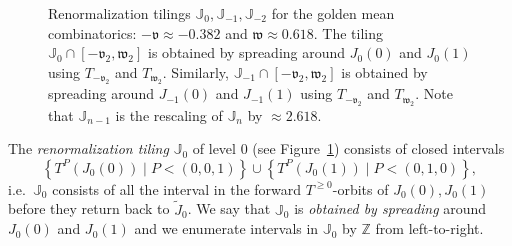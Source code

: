 \documentclass{amsart}
\newcommand{\1}{{\mathbb 1 }}
\newcommand{\vv}{\mathfrak{v}}
\newcommand{\ww}{\mathfrak{w}}
\newcommand{\Z}{\mathbb{Z}}
\theoremstyle{remark}
\numberwithin{equation}{section}
\theoremstyle{definition}
\theoremstyle{nonumberbreak}
\begin{document}
\begin{figure}

\caption{Renormalization tilings $\mathbb J_{0}, \mathbb J_{-1}, \mathbb J_{-2}$ for the golden mean combinatorics: $-\vv\approx -0.382$ and $\ww\approx 0.618$. The tiling $\mathbb J_{0}\cap [-\vv_2,\ww_2]$ is obtained by spreading around $J_0(0)$ and $J_0(1)$ using $T_{-\vv_2}$ and $T_{\ww_2}$. Similarly, $\mathbb J_{-1}\cap [-\vv_2,\ww_2]$ is obtained by spreading around $J_{-1}(0)$ and $J_{-1}(1)$ using $T_{-\vv_2}$ and $T_{\ww_2}$. Note that $\mathbb J_{n-1}$ is the rescaling of $\mathbb J_{n}$ by $\approx 2.618$.} 
\label{Fig:ren part of R}
\end{figure}
 
 The \emph{renormalization tiling} $\mathbb J_0$ of level $0$ (see Figure~\ref{Fig:ren part of R}) consists of closed intervals
\[\left\{T^P (J_0(0)) \mid P<(0,0,1)\right\}\cup \left\{T^P (J_0(1)) \mid P<(0,1,0)\right\} ,\] 
 i.e.~$\mathbb J_0$ consists of all the interval in the forward $T^{\ge0}$-orbits of $J_{0}(0) ,J_{0}(1)$ before they return back to $\widetilde J_0$. We say that 
 $\mathbb J_0$ is \emph{obtained by spreading} around $J_0(0)$ and $J_0(1)$ and we enumerate intervals in $\mathbb J_0$ by $\Z$ from left-to-right. 
 
\end{document}
